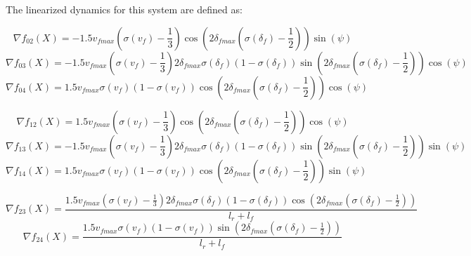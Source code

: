 \documentclass{article}
\theoremstyle{remark}
\theoremstyle{definition}
\begin{document}
The linearized dynamics for this system are defined as:

$$ \nabla f_{02}(X) = - 1.5v_{fmax}  \left ( \sigma(v_f) - \frac 1 3 \right ) \cos {\left ( 2\delta_{fmax}  \left ( \sigma(\delta_f) - \frac 1 2 \right ) \right) } \sin{( \psi )} $$
$$ \nabla f_{03}(X) = - 1.5v_{fmax}  \left ( \sigma(v_f) - \frac 1 3 \right ) 2\delta_{fmax} \sigma(\delta_f) (1 - \sigma(\delta_f) ) \sin {\left ( 2\delta_{fmax}  \left ( \sigma(\delta_f) - \frac 1 2 \right ) \right) } \cos{( \psi )} $$
$$ \nabla f_{04}(X) = 1.5v_{fmax}  \sigma(v_f) ( 1 - \sigma(v_f) ) \cos {\left ( 2\delta_{fmax}  \left ( \sigma(\delta_f) - \frac 1 2 \right ) \right) } \cos{( \psi )} $$

$$ \nabla f_{12}(X) = 1.5v_{fmax}  \left ( \sigma(v_f) - \frac 1 3 \right ) \cos {\left ( 2\delta_{fmax}  \left ( \sigma(\delta_f) - \frac 1 2 \right ) \right) } \cos{( \psi )} $$
$$ \nabla f_{13}(X) = - 1.5v_{fmax}  \left ( \sigma(v_f) - \frac 1 3 \right ) 2\delta_{fmax} \sigma(\delta_f) (1 - \sigma(\delta_f) ) \sin {\left ( 2\delta_{fmax}  \left ( \sigma(\delta_f) - \frac 1 2 \right ) \right) } \sin{( \psi )} $$
$$ \nabla f_{14}(X) = 1.5v_{fmax}  \sigma(v_f) ( 1 - \sigma(v_f) ) \cos {\left ( 2\delta_{fmax}  \left ( \sigma(\delta_f) - \frac 1 2 \right ) \right) } \sin{( \psi )} $$

$$ \nabla f_{23}(X) = \frac { 1.5v_{fmax}  \left ( \sigma(v_f) - \frac 1 3 \right ) 2\delta_{fmax} \sigma(\delta_f) (1 - \sigma(\delta_f) ) \cos {( 2\delta_{fmax}  \left ( \sigma(\delta_f) - \frac 1 2 \right ) ) }} {l_r + l_f}  $$
$$ \nabla f_{24}(X) =  \frac { 1.5v_{fmax} \sigma(v_f) ( 1 - \sigma(v_f) ) \sin {( 2\delta_{fmax}  \left ( \sigma(\delta_f) - \frac 1 2 \right ) ) }} {l_r + l_f} $$
\end{document}
